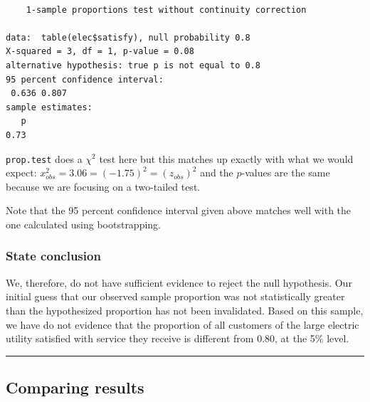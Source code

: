 \documentclass[12pt,]{krantz}
\makeatletter
\newenvironment{Shaded}{\begin{snugshade}}{\end{snugshade}}
\newcommand{\KeywordTok}[1]{\textcolor[rgb]{0.27,0.27,0.27}{\textbf{#1}}}
\newcommand{\DataTypeTok}[1]{\textcolor[rgb]{0.27,0.27,0.27}{#1}}
\newcommand{\FloatTok}[1]{\textcolor[rgb]{0.06,0.06,0.06}{#1}}
\newcommand{\StringTok}[1]{\textcolor[rgb]{0.5,0.5,0.5}{#1}}
\newcommand{\OtherTok}[1]{\textcolor[rgb]{0.37,0.37,0.37}{#1}}
\newcommand{\OperatorTok}[1]{\textcolor[rgb]{0.43,0.43,0.43}{\textbf{#1}}}
\newcommand{\NormalTok}[1]{#1}
\newenvironment{kframe}{%
\medskip{}
\setlength{\fboxsep}{.8em}
 \def\at@end@of@kframe{}%
 \ifinner\ifhmode%
  \def\at@end@of@kframe{\end{minipage}}%
  \begin{minipage}{\columnwidth}%
 \fi\fi%
 \def\FrameCommand##1{\hskip\@totalleftmargin \hskip-\fboxsep
 \colorbox{shadecolor}{##1}\hskip-\fboxsep
     \hskip-\linewidth \hskip-\@totalleftmargin \hskip\columnwidth}%
 \MakeFramed {\advance\hsize-\width
   \@totalleftmargin\z@ \linewidth\hsize
   \@setminipage}}%
 {\par\unskip\endMakeFramed%
 \at@end@of@kframe}
\renewenvironment{Shaded}{\begin{kframe}}{\end{kframe}}
\theoremstyle{definition}
\theoremstyle{definition}
\theoremstyle{definition}
\theoremstyle{remark}
\makeatother
\begin{document}
\begin{Shaded}
\end{Shaded}

\begin{verbatim}

    1-sample proportions test without continuity correction

data:  table(elec$satisfy), null probability 0.8
X-squared = 3, df = 1, p-value = 0.08
alternative hypothesis: true p is not equal to 0.8
95 percent confidence interval:
 0.636 0.807
sample estimates:
   p 
0.73 
\end{verbatim}

\texttt{prop.test} does a \(\chi^2\) test here but this matches up
exactly with what we would expect:
\(x^2_{obs} = 3.06 = (-1.75)^2 = (z_{obs})^2\) and the \(p\)-values are
the same because we are focusing on a two-tailed test.

Note that the 95 percent confidence interval given above matches well
with the one calculated using bootstrapping.

\subsubsection*{State conclusion}\label{state-conclusion-1}


We, therefore, do not have sufficient evidence to reject the null
hypothesis. Our initial guess that our observed sample proportion was
not statistically greater than the hypothesized proportion has not been
invalidated. Based on this sample, we have do not evidence that the
proportion of all customers of the large electric utility satisfied with
service they receive is different from 0.80, at the 5\% level.

\begin{center}\rule{0.5\linewidth}{\linethickness}\end{center}

\subsection{Comparing results}\label{comparing-results-1}
\end{document}
